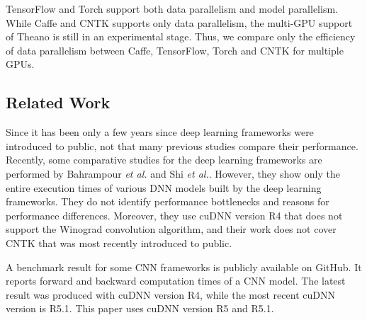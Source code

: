 TensorFlow and Torch support both data parallelism and model parallelism. While Caffe and CNTK supports only data parallelism, the multi-GPU support of Theano is still in an experimental stage. Thus, we compare only the efficiency of data parallelism between Caffe, TensorFlow, Torch and CNTK for multiple GPUs. 

\subsection{Related Work}
Since it has been only a few years since deep learning frameworks were introduced to public, not that many previous studies compare their performance. Recently, some comparative studies for the deep learning frameworks are performed by Bahrampour \textit{et al.}\cite{DBLP:journals/corr/BahrampourRSS15} and Shi \textit{et al.}\cite{DBLP:journals/corr/ShiWXC16}. However, they show only the entire execution times of various DNN models built by the deep learning frameworks. They do not identify performance bottlenecks and reasons for performance differences. Moreover, they use cuDNN version R4 that does not support the Winograd convolution algorithm, and their work does not cover CNTK that was most recently introduced to public.

A benchmark result for some CNN frameworks is publicly available on GitHub\cite{convnet-benchmarks}. It reports forward and backward computation times of a CNN model. The latest result was produced with cuDNN version R4, while the most recent cuDNN version is R5.1. This paper uses cuDNN version R5 and R5.1.
